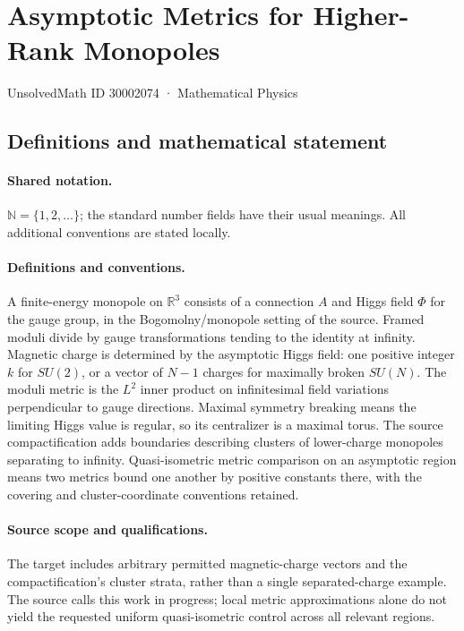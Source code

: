 \documentclass[11pt]{article}
\begin{document}
\setcounter{section}{30002073}
\section{Asymptotic Metrics for Higher-Rank Monopoles}\label{30002074}
{\small UnsolvedMath ID 30002074 · Mathematical Physics}
\subsection{Definitions and mathematical statement}

\paragraph{Shared notation.}$\mathbb N=\{1,2,\ldots\}$; the standard number fields have their usual meanings. All additional conventions are stated locally.


\paragraph{Definitions and conventions.} A finite-energy monopole on $\mathbb R^3$ consists of a connection $A$ and Higgs field $\Phi$ for the gauge group, in the Bogomolny/monopole setting of the source. Framed moduli divide by gauge transformations tending to the identity at infinity. Magnetic charge is determined by the asymptotic Higgs field: one positive integer $k$ for $SU(2)$, or a vector of $N-1$ charges for maximally broken $SU(N)$. The moduli metric is the $L^2$ inner product on infinitesimal field variations perpendicular to gauge directions. Maximal symmetry breaking means the limiting Higgs value is regular, so its centralizer is a maximal torus. The source compactification adds boundaries describing clusters of lower-charge monopoles separating to infinity. Quasi-isometric metric comparison on an asymptotic region means two metrics bound one another by positive constants there, with the covering and cluster-coordinate conventions retained.

\paragraph{Source scope and qualifications.} The target includes arbitrary permitted magnetic-charge vectors and the compactification's cluster strata, rather than a single separated-charge example. The source calls this work in progress; local metric approximations alone do not yield the requested uniform quasi-isometric control across all relevant regions.
\end{document}
